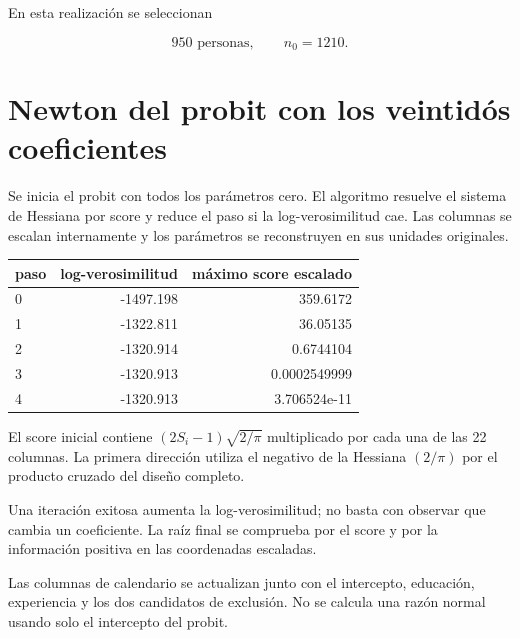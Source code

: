 \documentclass[11pt,a4paper]{article}
\begin{document}
En esta realización se seleccionan

\[
950\text{ personas},\qquad n_0=1210.
\]

\clearpage
\section{Newton del probit con los veintidós coeficientes}

Se inicia el probit con todos los parámetros cero. El algoritmo resuelve el sistema de Hessiana por score y reduce el paso si la log-verosimilitud cae. Las columnas se escalan internamente y los parámetros se reconstruyen en sus unidades originales.

\begin{center}\small
\begin{tabular}{lrr}
\toprule
paso & log-verosimilitud & máximo score escalado\\\midrule
0 & -1497.198 & 359.6172\\
1 & -1322.811 & 36.05135\\
2 & -1320.914 & 0.6744104\\
3 & -1320.913 & 0.0002549999\\
4 & -1320.913 & 3.706524e-11\\
\bottomrule
\end{tabular}\end{center}

El score inicial contiene $(2S_i-1)\sqrt{2/\pi}$ multiplicado por cada una de las 22 columnas. La primera dirección utiliza el negativo de la Hessiana $(2/\pi)$ por el producto cruzado del diseño completo.

Una iteración exitosa aumenta la log-verosimilitud; no basta con observar que cambia un coeficiente. La raíz final se comprueba por el score y por la información positiva en las coordenadas escaladas.

Las columnas de calendario se actualizan junto con el intercepto, educación, experiencia y los dos candidatos de exclusión. No se calcula una razón normal usando solo el intercepto del probit.

\clearpage
\end{document}

